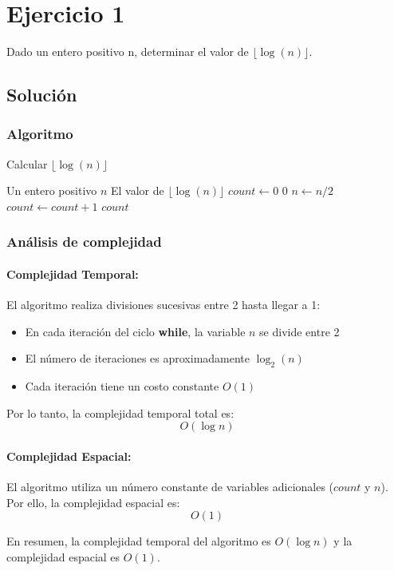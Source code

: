 \section{Ejercicio 1}
Dado un entero positivo n, determinar el valor de $\lfloor\log(n)\rfloor$.

\subsection*{Solución}
\subsubsection*{Algoritmo}
\begin{algorithm}[H]
\caption{Calcular $\lfloor\log(n)\rfloor$}
\begin{algorithmic}[1]
\REQUIRE Un entero positivo $n$
\ENSURE El valor de $\lfloor\log(n)\rfloor$
\STATE $count \gets 0$
    \RETURN $0$
\ENDIF
{}
    \STATE $n \gets n/2$
    \STATE $count \gets count + 1$
\ENDWHILE
\RETURN $count$
\end{algorithmic}
\end{algorithm}

\subsubsection*{Análisis de complejidad}
\paragraph{Complejidad Temporal:}
El algoritmo realiza divisiones sucesivas entre 2 hasta llegar a 1:
\begin{itemize}
    \item En cada iteración del ciclo \textbf{while}, la variable $n$ se divide entre 2
    \item El número de iteraciones es aproximadamente $\log_2(n)$
    \item Cada iteración tiene un costo constante $O(1)$
\end{itemize}
Por lo tanto, la complejidad temporal total es:
\[
O(\log n)
\]

\paragraph{Complejidad Espacial:}
El algoritmo utiliza un número constante de variables adicionales ($count$ y $n$). Por ello, la complejidad espacial es:
\[
O(1)
\]

En resumen, la complejidad temporal del algoritmo es $O(\log n)$ y la complejidad espacial es $O(1)$. 